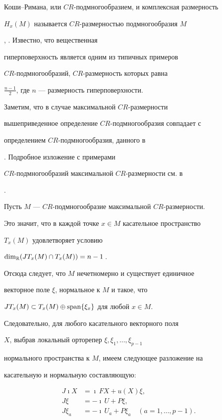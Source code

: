 Коши--Римана, или $CR$-подмногообразием, и комплексная размерность


$H_x(M)$ называется $CR$-размерностью подмногообразия $M$


\cite{NirWells}, \cite{Tumanov}. Известно, что вещественная


гиперповерхность является одним из типичных примеров


$CR$-подмногообразий,  $CR$-размерность которых равна


$\frac{n-1}{2}$, где $n$ --- размерность гиперповерхности.


Заметим, что в случае максимальной $CR$-размерности


вышеприведенное определение $CR$-подмногообразия совпадает с


определением $CR$-подмногообразия, данного в


\cite{Bejancu}. Подробное изложение с примерами


$CR$-подмногообразий максимальной $CR$-размерности см. в


\cite{Banach}.








Пусть  $M$ --- $CR$-подмногообразие максимальной $CR$-размерности.


Это значит, что в каждой точке $x \in M$ касательное пространство


$T_x(M)$ удовлетворяет условию


$\dim_{\Bbb R}(JT_x(M)\cap T_x(M))=n-1\,$.


Отсюда следует, что $M$ нечетномерно и существует единичное


векторное поле $\xi$, нормальное к $M$ и такое, что


$JT_x(M)\subset T_x(M)\oplus \operatorname{span}\{\xi_x\}$ для любой $x\in M$.


Следовательно, для любого касательного векторного поля


$X$, выбрав локальный орторепер $\xi,\xi_1,\dotsc,\xi_{p-1}$


нормального пространства к $M$, имеем следующее разложение на


касательную и нормальную составляющую:


\begin{align}


J\imath X &=\imath\,FX+u(X)\xi, \\


J\xi &=-\imath\,U+P\xi, \\


J\xi_a &=-\imath\,U_a+P\xi_a\quad (a=1,\dotsc,p-1).


\end{align}


